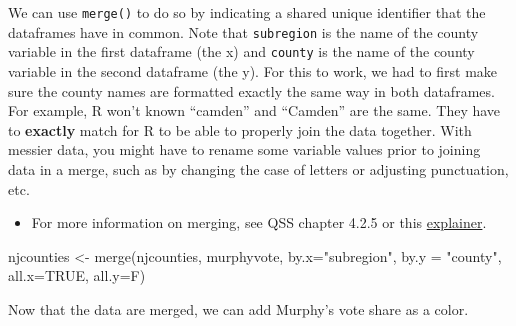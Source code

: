 \documentclass[
  letterpaper,
  DIV=11,
  numbers=noendperiod]{scrreprt}
\newenvironment{Shaded}{\begin{snugshade}}{\end{snugshade}}
\newcommand{\AttributeTok}[1]{\textcolor[rgb]{0.40,0.45,0.13}{#1}}
\newcommand{\ConstantTok}[1]{\textcolor[rgb]{0.56,0.35,0.01}{#1}}
\newcommand{\FunctionTok}[1]{\textcolor[rgb]{0.28,0.35,0.67}{#1}}
\newcommand{\NormalTok}[1]{\textcolor[rgb]{0.00,0.23,0.31}{#1}}
\newcommand{\OtherTok}[1]{\textcolor[rgb]{0.00,0.23,0.31}{#1}}
\newcommand{\StringTok}[1]{\textcolor[rgb]{0.13,0.47,0.30}{#1}}
\providecommand{\tightlist}{%
  \setlength{\itemsep}{0pt}\setlength{\parskip}{0pt}}\usepackage{longtable,booktabs,array}
\begin{document}
We can use \texttt{merge()} to do so by indicating a shared unique
identifier that the dataframes have in common. Note that
\texttt{subregion} is the name of the county variable in the first
dataframe (the x) and \texttt{county} is the name of the county variable
in the second dataframe (the y). For this to work, we had to first make
sure the county names are formatted exactly the same way in both
dataframes. For example, R won't known ``camden'' and ``Camden'' are the
same. They have to \textbf{exactly} match for R to be able to properly
join the data together. With messier data, you might have to rename some
variable values prior to joining data in a merge, such as by changing
the case of letters or adjusting punctuation, etc.

\begin{itemize}
\tightlist
\item
  For more information on merging, see QSS chapter 4.2.5 or this
  \href{https://sejdemyr.github.io/r-tutorials/statistics/tutorial5.html}{explainer}.
\end{itemize}

\begin{Shaded}
\begin{Highlighting}[]
\NormalTok{njcounties }\OtherTok{\textless{}{-}} \FunctionTok{merge}\NormalTok{(njcounties, murphyvote, }
                    \AttributeTok{by.x=}\StringTok{"subregion"}\NormalTok{, }\AttributeTok{by.y =} \StringTok{"county"}\NormalTok{, }
                    \AttributeTok{all.x=}\ConstantTok{TRUE}\NormalTok{, }\AttributeTok{all.y=}\NormalTok{F)}
\end{Highlighting}
\end{Shaded}

Now that the data are merged, we can add Murphy's vote share as a color.
\end{document}
